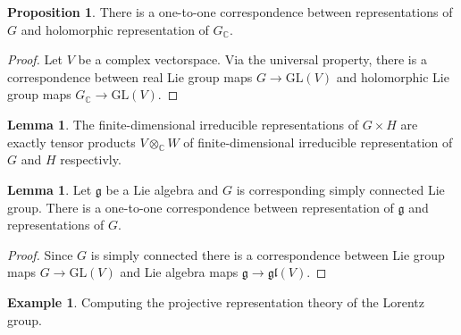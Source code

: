 \documentclass[12pt]{extarticle}
\theoremstyle{definition}
\newtheorem{lemma}[theorem]{Lemma}
\newtheorem{proposition}[theorem]{Proposition}
\newtheorem{example}[theorem]{Example}
\newcommand{\GL}[1]{\mathrm{GL}\left(#1\right)}
\newcommand{\g}{\mathfrak{g}}
\newcommand{\gl}[1]{\mathfrak{gl}\left(#1\right)}
\newcommand{\C}{\mathbb{C}}
\begin{document}
\begin{proposition}
There is a one-to-one correspondence between  representations of $G$ and holomorphic representation of $G_\C$.
\end{proposition}

\begin{proof}
Let $V$ be a complex vectorspace. Via the universal property, there is a correspondence between real Lie group maps $G \to \GL{V}$ and holomorphic Lie group maps $G_\C \to \GL{V}$. 
\end{proof}

\begin{lemma}
The finite-dimensional irreducible representations of $G \times H$ are exactly tensor products $V \otimes_\C W$ of finite-dimensional irreducible representation of $G$ and $H$ respectivly.
\end{lemma}

\begin{lemma}
Let $\g$ be a Lie algebra and $G$ is corresponding simply connected Lie group. There is a one-to-one correspondence between representation of $\g$ and representations of $G$.
\end{lemma}

\begin{proof}
Since $G$ is simply connected there is a correspondence between Lie group maps $G \to \GL{V}$ and Lie algebra maps $\g \to \gl{V}$. 
\end{proof}

\begin{example}
Computing the projective representation theory of the Lorentz group.
\end{example}

\renewcommand{\k}{\mathfrak{k}}
\renewcommand{\sl}{\mathfrak{sl}}
\newcommand{\su}{\mathfrak{su}}
\end{document}
